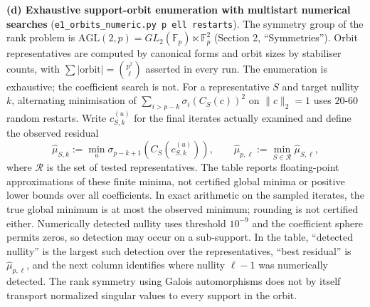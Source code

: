 \documentclass[
  11pt,
  a4paper,
]{article}
\begin{document}
\textbf{(d) Exhaustive support-orbit enumeration with multistart
numerical searches} ({\small\texttt{e1\_\allowbreak{}orbits\_\allowbreak{}numeric.\allowbreak{}py\ p\ ell\ restarts}}).
The symmetry group of the rank problem is
\(\mathrm{AGL}(2,\allowbreak{}p)=GL_2(\mathbb F_p)\ltimes\mathbb F_p^2\) (Section 2,
``Symmetries''). Orbit representatives are computed by canonical forms
and orbit sizes by stabiliser counts, with
\(\sum|\mathrm{orbit}|=\binom{p^2}{\ell}\) asserted in every run. The
enumeration is exhaustive; the coefficient search is not. For a
representative \(S\) and target nullity \(k\), alternating minimisation
of \(\sum_{i>p-k}\sigma_i(C_S(c))^2\) on \(\|c\|_2=1\) uses
\(20\)-\(60\) random restarts. Write \(c^{(u)}_{S,\allowbreak{}k}\) for the final
iterates actually examined and define the observed residual
\[\widehat\mu_{S,k}:=\min_u\sigma_{p-k+1}(C_S(c^{(u)}_{S,k})),\qquad
\widehat\mu_{p,\ell}:=\min_{S\in\mathcal R}\widehat\mu_{S,\ell},\] where
\(\mathcal R\) is the set of tested representatives. The table reports
floating-point approximations of these finite minima, not certified
global minima or positive lower bounds over all coefficients. In exact
arithmetic on the sampled iterates, the true global minimum is at most
the observed minimum; rounding is not certified either. Numerically
detected nullity uses threshold \(10^{-9}\) and the coefficient sphere
permits zeros, so detection may occur on a sub-support. In the table,
``detected nullity'' is the largest such detection over the
representatives, ``best residual'' is \(\widehat\mu_{p,\allowbreak{}\ell}\), and the
next column identifies where nullity \(\ell-1\) was numerically
detected. The rank symmetry using Galois automorphisms does not by
itself transport normalized singular values to every support in the
orbit.
\end{document}
